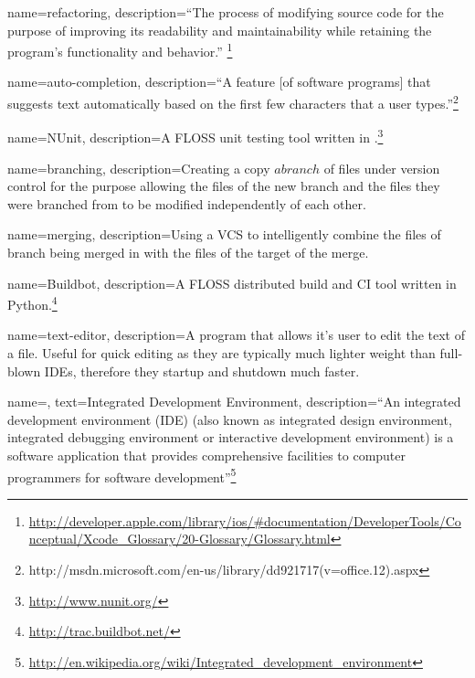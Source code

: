 

{
name=refactoring,
description={``The process of modifying source code for the purpose of improving its readability and maintainability while retaining the program's functionality and behavior.'' \footnote{\url{http://developer.apple.com/library/ios/\#documentation/DeveloperTools/Conceptual/Xcode_Glossary/20-Glossary/Glossary.html}}}
}

{
name=auto-completion,
description={``A feature {[}of software programs{]} that suggests text automatically based on the first few characters that a user types.''\footnote{http://msdn.microsoft.com/en-us/library/dd921717(v=office.12).aspx}}
}

{
name=NUnit,
description={A \gls{FLOSS} unit testing tool written in \CSharp.\footnote{\url{http://www.nunit.org/}}}
}

{
name=branching,
description={Creating a copy \(a branch\) of files under version control for the purpose allowing the files of the new branch and the files they were branched from to be modified independently of each other.
}
}

{
name=merging,
description={Using a \gls{VCS} to intelligently combine the files of branch being merged in with the files of the target of the merge.
}
}

{
name=Buildbot,
description={A \gls{FLOSS} distributed build and \gls{CI} tool written in Python.\footnote{\url{http://trac.buildbot.net/}}}
}

{
name=text-editor,
description={A program that allows it's user to edit the text of a file. Useful for quick editing as they are typically much lighter weight than full-blown \glspl{IDE}, therefore they startup and shutdown much faster.}
}



{
name=,
text=Integrated Development Environment,
description={``An integrated development environment (IDE) (also known as integrated design environment, integrated debugging environment or interactive development environment) is a software application that provides comprehensive facilities to computer programmers for software development''\footnote{\url{http://en.wikipedia.org/wiki/Integrated_development_environment}}}
}	

